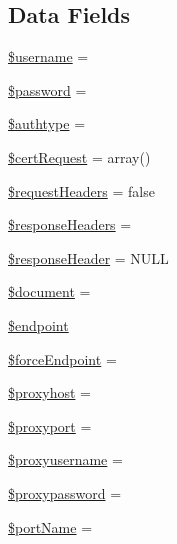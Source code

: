 \subsection*{Data Fields}
\begin{DoxyCompactItemize}
\item 
\hyperlink{classnusoap__client_a0eb82aa5f81cf845de4b36cd653c42cf}{\$username} = \textquotesingle{}\textquotesingle{}
\item 
\hyperlink{classnusoap__client_a607686ef9f99ea7c42f4f3dd3dbb2b0d}{\$password} = \textquotesingle{}\textquotesingle{}
\item 
\hyperlink{classnusoap__client_ae81871b02c5845eb3a1071eb24e1f29c}{\$authtype} = \textquotesingle{}\textquotesingle{}
\item 
\hyperlink{classnusoap__client_adcbe9a77644bad97ed599d1651bd2719}{\$cert\+Request} = array()
\item 
\hyperlink{classnusoap__client_a245d2deb868c1cc1a23b10c48c6d0754}{\$request\+Headers} = false
\item 
\hyperlink{classnusoap__client_a02f80cf3a7fe7cf42c97b821c167b934}{\$response\+Headers} = \textquotesingle{}\textquotesingle{}
\item 
\hyperlink{classnusoap__client_a0c1b0ae471226114a6ec9ef70ac5350d}{\$response\+Header} = N\+U\+L\+L
\item 
\hyperlink{classnusoap__client_ac5a31edb787609a3143dec9bfa8063ea}{\$document} = \textquotesingle{}\textquotesingle{}
\item 
\hyperlink{classnusoap__client_afb5204f7604df2f50a0058cb0e024875}{\$endpoint}
\item 
\hyperlink{classnusoap__client_afdcf6cf88adc9e9f3cf412605b74ce47}{\$force\+Endpoint} = \textquotesingle{}\textquotesingle{}
\item 
\hyperlink{classnusoap__client_a54407bcc777ac313a172561a8ff976c6}{\$proxyhost} = \textquotesingle{}\textquotesingle{}
\item 
\hyperlink{classnusoap__client_ac396538deee1152f84f9ddabac2c2366}{\$proxyport} = \textquotesingle{}\textquotesingle{}
\item 
\hyperlink{classnusoap__client_aaa30711a40f8f7bae4cd7060414e0fe1}{\$proxyusername} = \textquotesingle{}\textquotesingle{}
\item 
\hyperlink{classnusoap__client_a98c0d3b74811ee643f7d1fce47f1b281}{\$proxypassword} = \textquotesingle{}\textquotesingle{}
\item 
\hyperlink{classnusoap__client_ab68542a377115148d260f92d945c21ec}{\$port\+Name} = \textquotesingle{}\textquotesingle{}

\end{DoxyCompactItemize}
